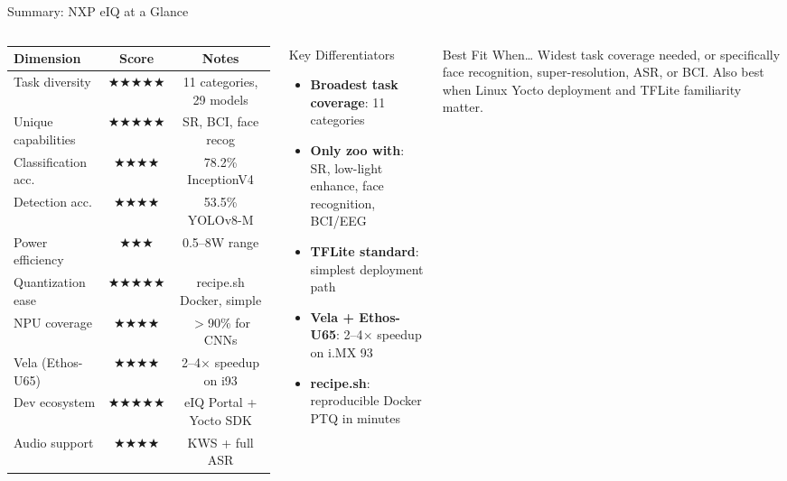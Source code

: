 \documentclass[aspectratio=169]{beamer}
\begin{document}
\begin{frame}{Summary: NXP eIQ at a Glance}
\begin{columns}
\small
\begin{tabular}{lcc}
\toprule
\textbf{Dimension} & \textbf{Score} & \textbf{Notes}\\
\midrule
Task diversity & $\bigstar\bigstar\bigstar\bigstar\bigstar$ & 11 categories, 29 models\\
Unique capabilities & $\bigstar\bigstar\bigstar\bigstar\bigstar$ & SR, BCI, face recog\\
Classification acc. & $\bigstar\bigstar\bigstar\bigstar$ & 78.2\% InceptionV4\\
Detection acc. & $\bigstar\bigstar\bigstar\bigstar$ & 53.5\% YOLOv8-M\\
Power efficiency & $\bigstar\bigstar\bigstar$ & 0.5--8W range\\
Quantization ease & $\bigstar\bigstar\bigstar\bigstar\bigstar$ & recipe.sh Docker, simple\\
NPU coverage & $\bigstar\bigstar\bigstar\bigstar$ & $>$90\% for CNNs\\
Vela (Ethos-U65) & $\bigstar\bigstar\bigstar\bigstar$ & 2--4$\times$ speedup on i93\\
Dev ecosystem & $\bigstar\bigstar\bigstar\bigstar\bigstar$ & eIQ Portal + Yocto SDK\\
Audio support & $\bigstar\bigstar\bigstar\bigstar$ & KWS + full ASR\\
\bottomrule
\end{tabular}
\begin{block}{Key Differentiators}
\begin{itemize}
  \item \textbf{Broadest task coverage}: 11 categories
  \item \textbf{Only zoo with}: SR, low-light enhance, face recognition, BCI/EEG
  \item \textbf{TFLite standard}: simplest deployment path
  \item \textbf{Vela + Ethos-U65}: 2--4$\times$ speedup on i.MX 93
  \item \textbf{recipe.sh}: reproducible Docker PTQ in minutes
\end{itemize}
\end{block}
\begin{alertblock}{Best Fit When\ldots}
\footnotesize Widest task coverage needed, or specifically face recognition, super-resolution, ASR, or BCI. Also best when Linux Yocto deployment and TFLite familiarity matter.
\end{alertblock}
\end{columns}
\end{frame}
\end{document}
